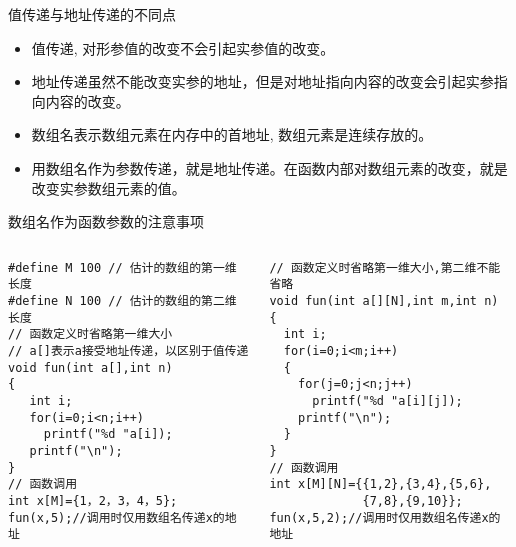 \begin{frame}{值传递与地址传递的不同点}
\vspace{-0.2cm}
\begin{itemize}
	\item 值传递, 对形参值的改变不会引起实参值的改变。
	\item 地址传递虽然不能改变实参的地址，但是对地址指向内容的改变会引起实参指向内容的改变。
	\item 数组名表示数组元素在内存中的首地址, 数组元素是连续存放的。
	\item 用数组名作为参数传递，就是地址传递。在函数内部对数组元素的改变，就是改变实参数组元素的值。
\end{itemize}

\end{frame}

\begin{frame}{数组名作为函数参数的注意事项}
\vspace{-0.3cm}
\begin{columns}[T]
\begin{lstlisting}
#define M 100 // 估计的数组的第一维长度
#define N 100 // 估计的数组的第二维长度
// 函数定义时省略第一维大小
// a[]表示a接受地址传递，以区别于值传递
void fun(int a[],int n)
{
   int i;
   for(i=0;i<n;i++) 
     printf("%d "a[i]);
   printf("\n");
}
// 函数调用
int x[M]={1，2，3，4，5};
fun(x,5);//调用时仅用数组名传递x的地址
\end{lstlisting}
\begin{lstlisting}[frame=leftline]
// 函数定义时省略第一维大小,第二维不能省略
void fun(int a[][N],int m,int n)
{
  int i;
  for(i=0;i<m;i++)
  {
    for(j=0;j<n;j++) 
      printf("%d "a[i][j]);
    printf("\n");
  }
}
// 函数调用
int x[M][N]={{1,2},{3,4},{5,6},
             {7,8},{9,10}};
fun(x,5,2);//调用时仅用数组名传递x的地址
\end{lstlisting}
\end{columns}
~\\
\end{frame}

